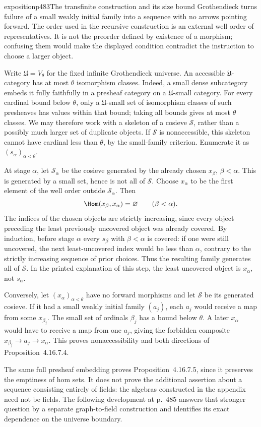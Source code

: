\begin{dcomment}{exposition}{p483}{The transfinite construction and its size bound}
Grothendieck turns failure of a small weakly initial family into a sequence with no arrows pointing forward. The order used in the recursive construction is an external well order of representatives. It is not the preorder defined by existence of a morphism; confusing them would make the displayed condition contradict the instruction to choose a larger object.

Write $\mathfrak U=V_\theta$ for the fixed infinite Grothendieck universe. An accessible $\mathfrak U$-category has at most $\theta$ isomorphism classes. Indeed, a small dense subcategory embeds it fully faithfully in a presheaf category on a $\mathfrak U$-small category. For every cardinal bound below $\theta$, only a $\mathfrak U$-small set of isomorphism classes of such presheaves has values within that bound; taking all bounds gives at most $\theta$ classes. We may therefore work with a skeleton of a cosieve $\mathcal S$, rather than a possibly much larger set of duplicate objects. If $\mathcal S$ is nonaccessible, this skeleton cannot have cardinal less than $\theta$, by the small-family criterion. Enumerate it as $(s_\alpha)_{\alpha<\theta}$.

At stage $\alpha$, let $\mathcal S_\alpha$ be the cosieve generated by the already chosen $x_\beta$, $\beta<\alpha$. This is generated by a small set, hence is not all of $\mathcal S$. Choose $x_\alpha$ to be the first element of the well order outside $\mathcal S_\alpha$. Then
\[
 \Hom(x_\beta,x_\alpha)=\varnothing\qquad(\beta<\alpha).
\]
The indices of the chosen objects are strictly increasing, since every object preceding the least previously uncovered object was already covered. By induction, before stage $\alpha$ every $s_\beta$ with $\beta<\alpha$ is covered: if one were still uncovered, the next least-uncovered index would be less than $\alpha$, contrary to the strictly increasing sequence of prior choices. Thus the resulting family generates all of $\mathcal S$. In the printed explanation of this step, the least uncovered object is $x_\alpha$, not $s_\alpha$.

Conversely, let $(x_\alpha)_{\alpha<\theta}$ have no forward morphisms and let $\mathcal S$ be its generated cosieve. If it had a small weakly initial family $(a_j)$, each $a_j$ would receive a map from some $x_{\beta_j}$. The small set of ordinals $\beta_j$ has a bound below $\theta$. A later $x_\alpha$ would have to receive a map from one $a_j$, giving the forbidden composite $x_{\beta_j}\to a_j\to x_\alpha$. This proves nonaccessibility and both directions of Proposition~4.16.7.4.

The same full presheaf embedding proves Proposition~4.16.7.5, since it preserves the emptiness of hom sets. It does not prove the additional assertion about a sequence consisting entirely of fields: the algebras constructed in the appendix need not be fields. The following development at p.~485 answers that stronger question by a separate graph-to-field construction and identifies its exact dependence on the universe boundary.
\end{dcomment}

